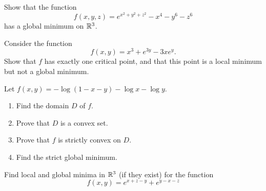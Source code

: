 \begin{problem}[Intermediate]\cite[p.35 \#26]{peressini1988mathematics}\label{problem:tricky}
Show that the function 
\begin{equation*}
f(x,y,z) = e^{x^2+y^2+z^2}-x^4-y^6-z^6
\end{equation*} 
has a global minimum on $\mathbb{R}^3$.
\end{problem}

\begin{problem}[Intermediate]\cite[p.36 \#33]{peressini1988mathematics}
Consider the function
\begin{equation*}
f(x,y) = x^3 + e^{3y} -3xe^y.
\end{equation*}
Show that $f$ has exactly one critical point, and that this point is a local minimum but not a global minimum.
\end{problem}

\begin{problem}[Basic]
Let $f(x,y) = -\log(1-x-y)-\log x -\log y$.
\begin{enumerate}
	\item Find the domain $D$ of $f$.
	\item Prove that $D$ is a convex set.
	\item Prove that $f$ is strictly convex on $D$.
	\item Find the strict global minimum.
\end{enumerate}
\end{problem}

\begin{problem}[Basic]\cite[p.81 \#27]{peressini1988mathematics}
Find local and global minima in $\mathbb{R}^3$ (if they exist) for the function 
\begin{equation*}
f(x,y) = e^{x+z-y}+e^{y-x-z}
\end{equation*}
\end{problem}